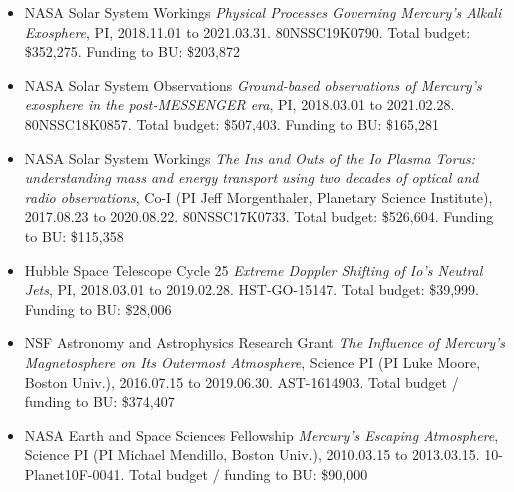 \documentclass[12pt]{report}
\begin{document}
\begin{itemize}
 \item NASA Solar System Workings  {\it Physical Processes Governing Mercury's Alkali Exosphere}, PI, 2018.11.01 to 2021.03.31. 80NSSC19K0790. Total budget: \$352,275. Funding to BU: \$203,872
 \item NASA Solar System Observations {\it Ground-based observations of Mercury's exosphere in the post-MESSENGER era}, PI, 2018.03.01 to 2021.02.28. 80NSSC18K0857. Total budget: \$507,403. Funding to BU: \$165,281
 \item NASA Solar System Workings {\it The Ins and Outs of the Io Plasma Torus: understanding mass and energy transport using two decades of optical and radio observations}, Co-I (PI Jeff Morgenthaler, Planetary Science Institute), 2017.08.23 to 2020.08.22. 80NSSC17K0733. Total budget: \$526,604. Funding to BU: \$115,358
 \item Hubble Space Telescope Cycle 25 {\it Extreme Doppler Shifting of Io's Neutral Jets}, PI, 2018.03.01 to 2019.02.28. HST-GO-15147. Total budget: \$39,999. Funding to BU: \$28,006
 \item NSF Astronomy and Astrophysics Research Grant {\it The Influence of Mercury's Magnetosphere on Its Outermost Atmosphere}, Science PI (PI Luke Moore, Boston Univ.), 2016.07.15 to 2019.06.30. AST-1614903. Total budget / funding to BU: \$374,407
 \item NASA Earth and Space Sciences Fellowship {\it Mercury's Escaping Atmosphere}, Science PI (PI Michael Mendillo, Boston Univ.), 2010.03.15 to 2013.03.15. 10-Planet10F-0041. Total budget / funding to BU: \$90,000
 \end{itemize}
\vspace{2 mm}
\end{document}
